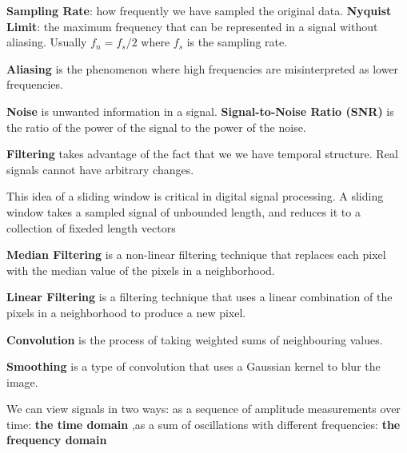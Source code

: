 \documentclass{article}
\begin{document}

\textbf{Sampling Rate}: how frequently we have sampled the original data.
\textbf{Nyquist Limit}: the maximum frequency that can be represented in a signal without aliasing.
Usually $f_n = f_s/2$ where $f_s$ is the sampling rate.


\textbf{Aliasing} is the phenomenon where high frequencies are misinterpreted as lower frequencies.


\textbf{Noise} is unwanted information in a signal.
\textbf{Signal-to-Noise Ratio (SNR)} is the ratio of the power of the signal to the power of the noise.


\textbf{Filtering} takes advantage of the fact that we we have temporal structure.
Real signals cannot have arbitrary changes.

This idea of a sliding window is critical in digital signal processing. A
sliding window takes a sampled signal of unbounded length, and reduces
it to a collection of fixeded length vectors


\textbf{Median Filtering} is a non-linear filtering technique that replaces each pixel with the median value of the pixels in a neighborhood.

\textbf{Linear Filtering} is a filtering technique that uses a linear combination of the pixels in a neighborhood to produce a new pixel.


\textbf{Convolution} is the process of taking weighted sums of neighbouring values.


\textbf{Smoothing} is a type of convolution that uses a Gaussian kernel to blur the image.


We can view signals in two ways: as a sequence of amplitude measurements over time: \textbf{the time domain}
,as a sum of oscillations with different frequencies: \textbf{the frequency domain}

\end{document}
